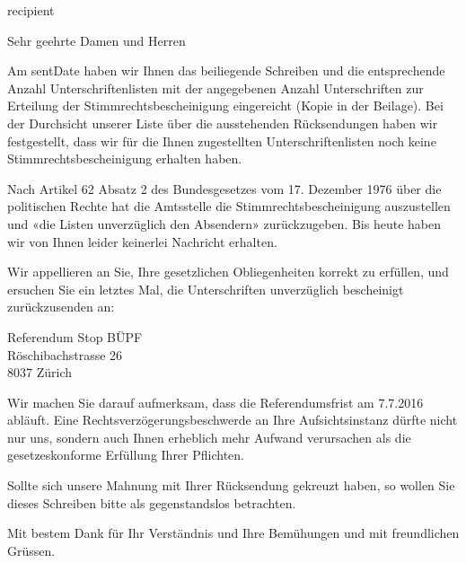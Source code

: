 \documentclass[a4paper,10pt,parskip=half]{scrlttr2}
\begin{document}
\begin{letter}{{{ recipient }}}





\opening{Sehr geehrte Damen und Herren }

Am {{ sentDate }} haben wir Ihnen das beiliegende Schreiben und die entsprechende Anzahl Unterschriftenlisten mit der angegebenen Anzahl Unterschriften zur Erteilung der Stimmrechtsbescheinigung eingereicht (Kopie in der Beilage). Bei der Durchsicht unserer Liste über die ausstehenden Rücksendungen haben wir festgestellt, dass wir für die Ihnen zugestellten Unterschriftenlisten noch keine Stimmrechtsbescheinigung erhalten haben. 
 
Nach Artikel 62 Absatz 2 des Bundesgesetzes vom 17. Dezember 1976 über die politischen Rechte hat die Amtsstelle die Stimmrechtsbescheinigung auszustellen und «die Listen unverzüglich den Absendern» zurückzugeben. Bis heute haben wir von Ihnen leider keinerlei Nachricht erhalten.
 
Wir appellieren an Sie, Ihre gesetzlichen Obliegenheiten korrekt zu erfüllen, und ersuchen Sie ein letztes Mal, die Unterschriften unverzüglich bescheinigt zurückzusenden an: 

\leftskip=3mm
Referendum Stop BÜPF \\
Röschibachstrasse 26 \\
8037 Zürich

\leftskip=0mm
Wir machen Sie darauf aufmerksam, dass die Referendumsfrist am 7.7.2016 abläuft. Eine Rechtsverzögerungsbeschwerde an Ihre Aufsichtsinstanz dürfte nicht nur uns, sondern auch Ihnen erheblich mehr Aufwand verursachen als die gesetzeskonforme Erfüllung Ihrer Pflichten.

Sollte sich unsere Mahnung mit Ihrer Rücksendung gekreuzt haben, so wollen Sie dieses Schreiben bitte als gegenstandslos betrachten. 

\closing{Mit bestem Dank für Ihr Verständnis und Ihre Bemühungen und mit freundlichen Grüssen.}

\end{letter}
\end{document}
